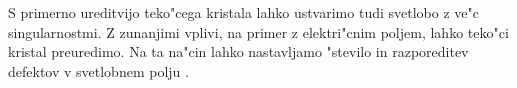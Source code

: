 \documentclass[12pt,twoside,openright,final]{report}
\begin{document}
S primerno ureditvijo teko"cega kristala lahko ustvarimo tudi svetlobo z ve"c singularnostmi. 
Z zunanjimi vplivi, na primer z elektri"cnim poljem, lahko teko"ci kristal preuredimo. 
Na ta na"cin lahko nastavljamo "stevilo in razporeditev defektov v svetlobnem polju \cite{brasselet-arrays}.

\end{document}
